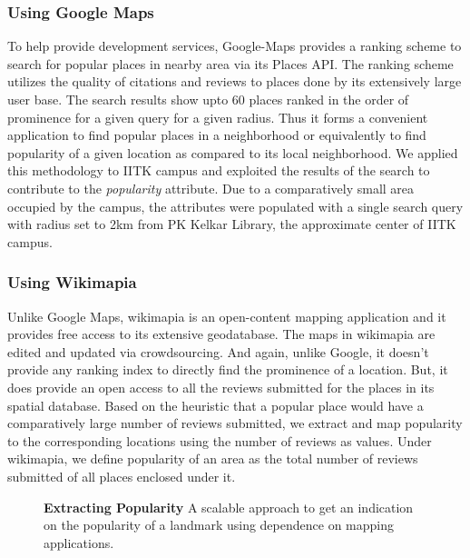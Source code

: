 \documentclass{iitkthesis}
\begin{document}
\subsubsection*{Using Google Maps}
To help provide development services, Google-Maps provides a ranking scheme to search for popular places in nearby area via its Places API. The ranking scheme utilizes the quality of citations and reviews to places done by its extensively large user base. The search results show upto 60 places ranked in the order of prominence for a given query for a given radius. Thus it forms a convenient application to find popular places in a neighborhood or equivalently to find popularity of a given location as compared to its local neighborhood. We applied this methodology to IITK campus and exploited the results of the search to contribute to the \textit{popularity} attribute. Due to a comparatively small area occupied by the campus, the attributes were populated with a single search query with radius set to 2km from PK Kelkar Library, the approximate center of IITK campus.

\subsubsection*{Using Wikimapia}
Unlike Google Maps, wikimapia is an open-content mapping application and it provides free access to its extensive geodatabase. The maps in wikimapia are edited and updated via crowdsourcing. And again, unlike Google, it doesn't provide any ranking index to directly find the prominence of a location. But, it does provide an open access to all the reviews submitted for the places in its spatial database. Based on the heuristic that a popular place would have a comparatively large number of reviews submitted, we extract and map popularity to the corresponding locations using the number of reviews as values. Under wikimapia, we define popularity of an area as the total number of reviews submitted of all places enclosed under it.
\begin{figure}
\centering
{}
\caption{\textbf{\textbf{Extracting Popularity}} A scalable approach to get an indication on the popularity of a landmark using dependence on mapping applications.}
\label{fig:popular}
 \end{figure}
\end{document}
